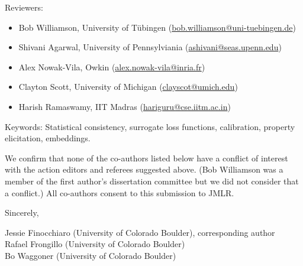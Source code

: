 Reviewers:
\begin{itemize}
    \item Bob Williamson, University of T\"ubingen (\url{bob.williamson@uni-tuebingen.de})
    \item Shivani Agarwal, University of Pennsylviania (\url{ashivani@seas.upenn.edu})
    \item Alex Nowak-Vila, Owkin (\url{alex.nowak-vila@inria.fr})
    \item Clayton Scott, University of Michigan (\url{clayscot@umich.edu})
    \item Harish Ramaswamy, IIT Madras (\url{hariguru@cse.iitm.ac.in})
\end{itemize}

Keywords: Statistical consistency, surrogate loss functions, calibration, property elicitation, embeddings.

We confirm that none of the co-authors listed below have a conflict of interest with the action editors and referees suggested above.
(Bob Williamson was a member of the first author's dissertation committee but we did not consider that a conflict.)
All co-authors consent to this submission to JMLR.

\bigskip

Sincerely,

\medskip

Jessie Finocchiaro (University of Colorado Boulder), corresponding author\\
Rafael Frongillo (University of Colorado Boulder)\\
Bo Waggoner (University of Colorado Boulder)








































